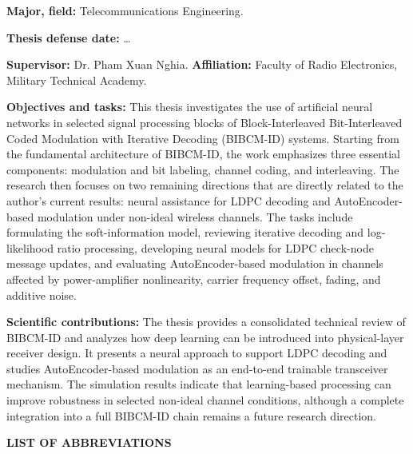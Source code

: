 ﻿\documentclass[a4paper,14pt]{extreport}
\begin{document}
\noindent\textbf{Major, field:} Telecommunications Engineering.

\noindent\textbf{Thesis defense date:} \ldots

\noindent\textbf{Supervisor:} Dr. Pham Xuan Nghia. \textbf{Affiliation:} Faculty of Radio Electronics, Military Technical Academy.

\noindent\textbf{Objectives and tasks:}
This thesis investigates the use of artificial neural networks in selected signal processing blocks of Block-Interleaved Bit-Interleaved Coded Modulation with Iterative Decoding (BIBCM-ID) systems. Starting from the fundamental architecture of BIBCM-ID, the work emphasizes three essential components: modulation and bit labeling, channel coding, and interleaving. The research then focuses on two remaining directions that are directly related to the author's current results: neural assistance for LDPC decoding and AutoEncoder-based modulation under non-ideal wireless channels. The tasks include formulating the soft-information model, reviewing iterative decoding and log-likelihood ratio processing, developing neural models for LDPC check-node message updates, and evaluating AutoEncoder-based modulation in channels affected by power-amplifier nonlinearity, carrier frequency offset, fading, and additive noise.

\noindent\textbf{Scientific contributions:}
The thesis provides a consolidated technical review of BIBCM-ID and analyzes how deep learning can be introduced into physical-layer receiver design. It presents a neural approach to support LDPC decoding and studies AutoEncoder-based modulation as an end-to-end trainable transceiver mechanism. The simulation results indicate that learning-based processing can improve robustness in selected non-ideal channel conditions, although a complete integration into a full BIBCM-ID chain remains a future research direction.

\newpage
{}
\begin{center}
  {\bfseries LIST OF ABBREVIATIONS}
\end{center}
\end{document}
